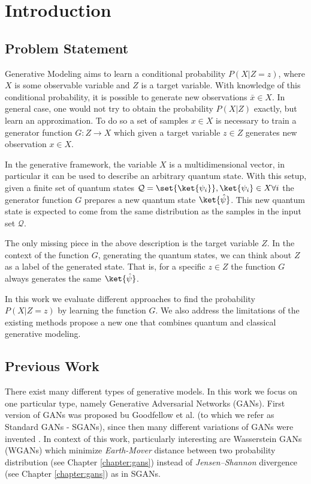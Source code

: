 \chapter{Introduction} \label{chapter:introduction}
\section{Problem Statement}
Generative Modeling aims to learn a conditional probability $P(X|Z = z)$, where $X$ is some observable variable and $Z$ is a target variable. With knowledge of this conditional probability, it is possible to generate new observations $\bar{x} \in X$. In general case, one would not try to obtain the probability $P(X|Z)$ exactly, but learn an approximation. To do so a set of samples $x \in X$ is necessary to train a generator function $G: Z \to X$ which given a target variable $z \in Z$ generates new observation $x \in X$. 

In the generative framework, the variable $X$ is a multidimensional vector, in particular it can be used to describe an arbitrary quantum state. With this setup, given a finite set of quantum states $\mathcal{Q} = \set{\ket{\psi_i}}, \ket{\psi_i} \in X \forall i$ the generator function $G$ prepares a new quantum state $\ket{\hat{\psi}}$. This new quantum state is expected to come from the same distribution as the samples in the input set $\mathcal{Q}$.

The only missing piece in the above description is the target variable $Z$. In
the context of the function $G$, generating the quantum states, we can think
about $Z$ as a label of the generated state. That is, for a specific $z \in Z$
the function $G$ always generates the same $\ket{\hat{\psi}}$.

In this work we evaluate different approaches to find the probability $P(X|Z =
z)$ by learning the function $G$. We also address the limitations of the
existing methods propose a new one that combines quantum and classical
generative modeling.
\section{Previous Work}
There exist many different types of generative models. In this work we focus on
one particular type, namely Generative Adversarial Networks (GANs). First
version of GANs was proposed bu Goodfellow et al.
\cite{goodfellow2014generative} (to which we refer as Standard GANs - SGANs),
since then many different variations of GANs were invented
\cite{mirza2014conditional}\cite{karras2019stylebased}\cite{radford2016unsupervised}.
In context of this work, particularly interesting are Wasserstein GANs
(WGANs)\cite{arjovsky2017wasserstein} which minimize \textit{Earth-Mover} distance
between two probability distribution (see Chapter \ref{chapter:gans}) instead of
\textit{Jensen–Shannon} divergence (see Chapter \ref{chapter:gans}) as in SGANs.

